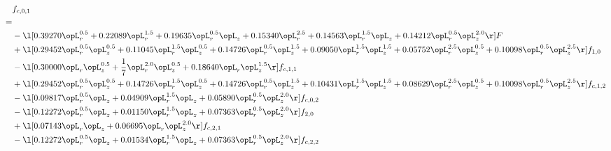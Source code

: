 \begin{alignat}{2} 
\label{eq:f_01_2} 
& f_{c,0,1} \nonumber \\ 
 = \\ 
& - \l[  0.39270 \opL_r^{0.5} +  0.22089 \opL_r^{1.5} +  0.19635 \opL_r^{0.5} \opL_z +  0.15340 \opL_r^{2.5} +  0.14563 \opL_r^{1.5} \opL_z +  0.14212 \opL_r^{0.5} \opL_z^{2.0}  \r] F \nonumber \\ 
& + \l[  0.29452 \opL_r^{0.5} \opL_z^{0.5} +  0.11045 \opL_r^{1.5} \opL_z^{0.5} +  0.14726 \opL_r^{0.5} \opL_z^{1.5} +  0.09050 \opL_r^{1.5} \opL_z^{1.5} +  0.05752 \opL_r^{2.5} \opL_z^{0.5} +  0.10098 \opL_r^{0.5} \opL_z^{2.5}  \r] f_{1,0} \nonumber \\ 
& - \l[  0.30000 \opL_r \opL_z^{0.5} + \frac{1}{7} \opL_r^{2.0} \opL_z^{0.5} +  0.18640 \opL_r \opL_z^{1.5}  \r] f_{c,1,1} \nonumber \\ 
& + \l[  0.29452 \opL_r^{0.5} \opL_z^{0.5} +  0.14726 \opL_r^{1.5} \opL_z^{0.5} +  0.14726 \opL_r^{0.5} \opL_z^{1.5} +  0.10431 \opL_r^{1.5} \opL_z^{1.5} +  0.08629 \opL_r^{2.5} \opL_z^{0.5} +  0.10098 \opL_r^{0.5} \opL_z^{2.5}  \r] f_{c,1,2} \nonumber \\ 
& - \l[  0.09817 \opL_r^{0.5} \opL_z +  0.04909 \opL_r^{1.5} \opL_z +  0.05890 \opL_r^{0.5} \opL_z^{2.0}  \r] f_{c,0,2} \nonumber \\ 
& - \l[  0.12272 \opL_r^{0.5} \opL_z +  0.01150 \opL_r^{1.5} \opL_z +  0.07363 \opL_r^{0.5} \opL_z^{2.0}  \r] f_{2,0} \nonumber \\ 
& + \l[  0.07143 \opL_r \opL_z +  0.06695 \opL_r \opL_z^{2.0}  \r] f_{c,2,1} \nonumber \\ 
& - \l[  0.12272 \opL_r^{0.5} \opL_z +  0.01534 \opL_r^{1.5} \opL_z +  0.07363 \opL_r^{0.5} \opL_z^{2.0}  \r] f_{c,2,2} \nonumber \\ 
\end{alignat} 


